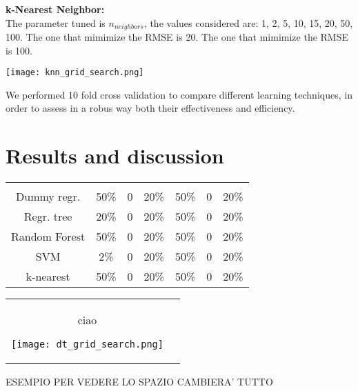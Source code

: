 \documentclass{article}
\begin{document}
\noindent 



\noindent
\begin{minipage}{0.5\textwidth} %
\textbf{k-Nearest Neighbor:} \\ The parameter tuned is $n_{neighbors}$, the values considered are: 1, 2, 5, 10, 15, 20, 50, 100. The one that mimimize the RMSE is 20.
The one that mimimize the RMSE is 100.
\end{minipage} %
\begin{minipage}{.55\textwidth} %
    \centering
    \texttt{[image: knn\_grid\_search.png]}
\end{minipage}





\noindent We performed 10 fold cross validation to compare different learning techniques, in order to assess in a robus way both their effectiveness and efficiency.
\section{Results and discussion}

\begin{tabular}{ccccccc}
\rowcolor{gray!90} \color{white}{Models} & \color{white}{RMSE} & \color{white}{$RMSE_{mean}$}& \color{white}{$RMSE_{var}$} & \color{white}{T} & \color{white}{$T_{mean}$}& \color{white}{$T_{var}$}\\ 
\rowcolor{gray!10} Dummy regr. & 50\% &0 & 20\% & 50\% &0 & 20\% \\ 

\rowcolor{white} Regr. tree & 20\% &0 & 20\% & 50\% &0 & 20\%\\ 

\rowcolor{gray!10} Random Forest & 50\% &0 & 20\% & 50\% &0 & 20\%\\ 

\rowcolor{white} SVM & 2\% &0 & 20\% & 50\% &0 & 20\%\\ 
\rowcolor{gray!10} k-nearest & 50\% &0 & 20\% & 50\% &0 & 20\%\\ 

\end{tabular}

\begin{tabular}{cc}
\begin{minipage}{.3\textwidth} %
ciao
\end{minipage} %

\begin{minipage}{.7\textwidth} %
\texttt{[image: dt\_grid\_search.png]}
\end{minipage}

\end{tabular}
ESEMPIO PER VEDERE LO SPAZIO CAMBIERA' TUTTO



\end{document}
